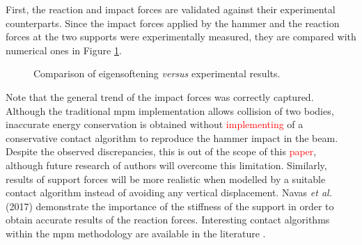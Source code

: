 \documentclass[preprint,12pt,a4paper]{elsarticle}
\begin{document}
First, the reaction and impact forces are validated against their
experimental counterparts. Since the impact forces applied by the
hammer and the reaction forces at the two supports were experimentally
measured, they are compared with numerical ones in Figure
\ref{fig:Reactions-Forces-impact-test}. 
\begin{figure}
  \centering
  \caption{Comparison of eigensoftening \textit{versus} experimental results.}
  \label{fig:Reactions-Forces-impact-test}
\end{figure}
Note that the general trend of the impact forces was correctly
captured. Although the traditional \acrshort{mpm} implementation allows collision of two bodies, inaccurate energy conservation is obtained without \textcolor{red}{implementing} of a conservative contact algorithm to reproduce the hammer impact in the beam.
Despite the observed discrepancies, this is out of the scope of this
\textcolor{red}{paper}, although future research of authors will overcome this
limitation. Similarly, results of support forces will be more
realistic when modelled by a suitable contact algorithm instead of
avoiding any vertical displacement. Navas {\it et al.}
(2017)\cite{Navas_2017_ES} demonstrate the importance of the stiffness
of the support in order to obtain accurate results of the reaction
forces. Interesting contact algorithms within the \acrshort{mpm}
methodology are available in the literature
\cite{Bardenhagen_Contact_2001,XZhang_Contact_2011}.
\end{document}
